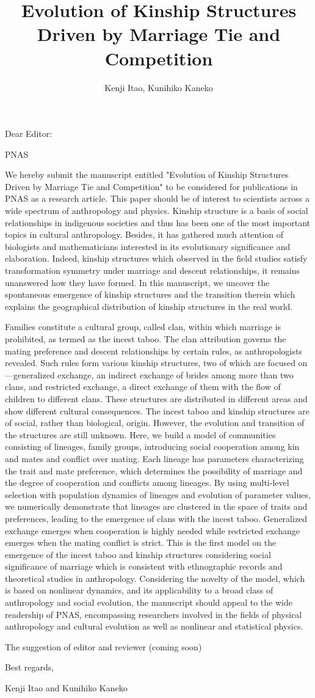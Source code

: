 \documentclass[a4j,12pt]{letter}
\title{Evolution of Kinship Structures Driven by Marriage Tie and Competition}
\author{Kenji Itao, Kunihiko Kaneko}
\begin{document}
Dear Editor:

PNAS

We hereby submit the manuscript entitled "Evolution of Kinship Structures Driven by Marriage Tie and Competition" to be considered for publications in PNAS as a research article.
This paper should be of interest to scientists across a wide spectrum of anthropology and physics.
Kinship structure is a basis of social relationships in indigenous societies and thus has been one of the most important topics in cultural anthropology. Besides, it has gathered much attention of biologists and mathematicians interested in its evolutionary significance and elaboration. Indeed, kinship structures which observed in the field studies satisfy transformation symmetry under marriage and descent relationships, it remains unanswered how they have formed. In this manuscript, we uncover the spontaneous emergence of kinship structures and the transition therein which explains the geographical distribution of kinship structures in the real world.

Families constitute a cultural group, called clan, within which marriage is prohibited, as termed as the incest taboo. The clan attribution governs the mating preference and descent relationships by certain rules, as anthropologists revealed. Such rules form various kinship structures, two of which are focused on---generalized exchange, an indirect exchange of brides among more than two clans, and restricted exchange, a direct exchange of them with the flow of children to different clans. These structures are distributed in different areas and show different cultural consequences. The incest taboo and kinship structures are of social, rather than biological, origin. However, the evolution and transition of the structures are still unknown. Here, we build a model of communities consisting of lineages, family groups, introducing social cooperation among kin and mates and conflict over mating. Each lineage has parameters characterizing the trait and mate preference, which determines the possibility of marriage and the degree of cooperation and conflicts among lineages. By using multi-level selection with population dynamics of lineages and evolution of parameter values, we numerically demonstrate that lineages are clustered in the space of traits and preferences, leading to the emergence of clans with the incest taboo. Generalized exchange emerges when cooperation is highly needed while restricted exchange emerges when the mating conflict is strict.
This is the first model on the emergence of the incest taboo and kinship structures considering social significance of marriage which is consistent with ethnographic records and theoretical studies in anthropology.
Considering the novelty of the model, which is based on nonlinear dynamics, and its applicability to a broad class of anthropology and social evolution, the manuscript should appeal to the wide readership of PNAS, encompassing researchers involved in the fields of physical anthropology and cultural evolution as well as nonlinear and statistical physics.

The suggestion of editor and reviewer (coming soon)

Best regards,

Kenji Itao and Kunihiko Kaneko
\end{document}
